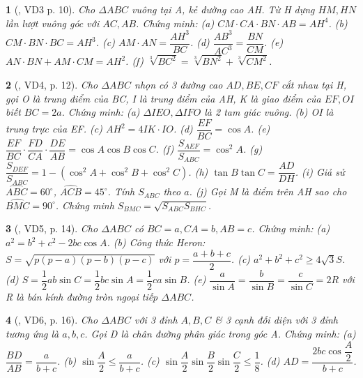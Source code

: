 \documentclass{article}
\newtheorem{baitoan}{}
\begin{document}
\begin{baitoan}[\cite{Kien_hinh_hoc_9}, VD3 p. 10]
	Cho $\Delta ABC$ vuông tại A, kẻ đường cao AH. Từ H dựng $HM,HN$ lần lượt vuông góc với $AC,AB$. Chứng minh: (a) $CM\cdot CA\cdot BN\cdot AB = AH^4$. (b) $CM\cdot BN\cdot BC = AH^3$. (c) $AM\cdot AN = \dfrac{AH^3}{BC}$. (d) $\dfrac{AB^3}{AC^3} = \dfrac{BN}{CM}$. (e) $AN\cdot BN + AM\cdot CM = AH^2$. (f) $\sqrt[3]{BC^2} = \sqrt[3]{BN^2} + \sqrt[3]{CM^2}$.
\end{baitoan}

\begin{baitoan}[\cite{Kien_hinh_hoc_9}, VD4, p. 12]
	Cho $\Delta ABC$ nhọn có 3 đường cao $AD,BE,CF$ cắt nhau tại H, gọi O là trung điểm của BC, I là trung điểm của AH, K là giao điểm của $EF,OI$ biết $BC = 2a$. Chứng minh: (a)  $\Delta IEO,\Delta IFO$ là 2 tam giác vuông. (b) OI là trung trực của EF. (c) $AH^2 = 4IK\cdot IO$. (d) $\dfrac{EF}{BC} = \cos A$. (e) $\dfrac{EF}{BC}\cdot\dfrac{FD}{CA}\cdot\dfrac{DE}{AB} = \cos A\cos B\cos C$. (f) $\dfrac{S_{AEF}}{S_{ABC}} = \cos^2A$. (g) $\dfrac{S_{DEF}}{S_{ABC}} = 1 - (\cos^2A + \cos^2B + \cos^2C)$. (h) $\tan B\tan C = \dfrac{AD}{DH}$. (i) Giả sử $\widehat{ABC} = 60^\circ$, $\widehat{ACB} = 45^\circ$. Tính $S_{ABC}$ theo $a$. (j) Gọi M là điểm trên AH sao cho $\widehat{BMC} = 90^\circ$. Chứng minh $S_{BMC} = \sqrt{S_{ABC}S_{BHC}}$.
\end{baitoan}

\begin{baitoan}[\cite{Kien_hinh_hoc_9}, VD5, p. 14]
	Cho $\Delta ABC$ có $BC = a,CA = b,AB = c$. Chứng minh: (a) $a^2 = b^2 + c^2 - 2bc\cos A$. (b) Công thức Heron: $S = \sqrt{p(p - a)(p - b)(p - c)}$ với $p = \dfrac{a + b + c}{2}$. (c) $a^2 + b^2 + c^2\ge4\sqrt{3}S$. (d) $S = \dfrac{1}{2}ab\sin C = \dfrac{1}{2}bc\sin A = \dfrac{1}{2}ca\sin B$. (e) $\dfrac{a}{\sin A} = \dfrac{b}{\sin B} = \dfrac{c}{\sin C} = 2R$ với R là bán kính đường tròn ngoại tiếp $\Delta ABC$.
\end{baitoan}

\begin{baitoan}[\cite{Kien_hinh_hoc_9}, VD6, p. 16]
	Cho $\Delta ABC$ với 3 đỉnh $A,B,C$ \& 3 cạnh đối diện với 3 đỉnh tương ứng là $a,b,c$. Gọi D là chân đường phân giác trong góc A. Chứng minh: (a) $\dfrac{BD}{AB} = \dfrac{a}{b + c}$. (b) $\sin\dfrac{A}{2}\le\dfrac{a}{b + c}$. (c) $\sin\dfrac{A}{2}\sin\dfrac{B}{2}\sin\dfrac{C}{2}\le\dfrac{1}{8}$. (d) $AD = \dfrac{2bc\cos\dfrac{A}{2}}{b + c}$.
\end{baitoan}
\end{document}
